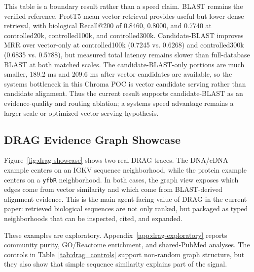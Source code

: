 \documentclass[11pt]{article}
\begin{document}
This table is a boundary result rather than a speed claim. BLAST remains the verified reference. ProtT5 mean vector retrieval provides useful but lower dense retrieval, with biological Recall@200 of 0.8460, 0.8000, and 0.7740 at controlled20k, controlled100k, and controlled300k. Candidate-BLAST improves MRR over vector-only at controlled100k (0.7245 vs. 0.6268) and controlled300k (0.6835 vs. 0.5788), but measured total latency remains slower than full-database BLAST at both matched scales. The candidate-BLAST-only portions are much smaller, 189.2 ms and 209.6 ms after vector candidates are available, so the systems bottleneck in this Chroma POC is vector candidate serving rather than candidate alignment. Thus the current result supports candidate-BLAST as an evidence-quality and routing ablation; a systems speed advantage remains a larger-scale or optimized vector-serving hypothesis.

\subsection{DRAG Evidence Graph Showcase}

Figure~\ref{fig:drag-showcase} shows two real DRAG traces. The DNA/cDNA example centers on an IGKV sequence neighborhood, while the protein example centers on a \texttt{yfbR} neighborhood. In both cases, the graph view exposes which edges come from vector similarity and which come from BLAST-derived alignment evidence. This is the main agent-facing value of DRAG in the current paper: retrieved biological sequences are not only ranked, but packaged as typed neighborhoods that can be inspected, cited, and expanded.

These examples are exploratory. Appendix~\ref{app:drag-exploratory} reports community purity, GO/Reactome enrichment, and shared-PubMed analyses. The controls in Table~\ref{tab:drag_controls} support non-random graph structure, but they also show that simple sequence similarity explains part of the signal.
\end{document}
